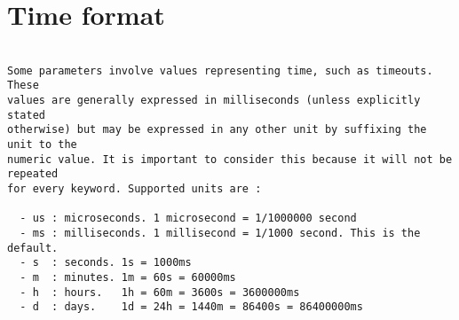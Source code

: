 
\section{Time format}

\begin{verbatim}

Some parameters involve values representing time, such as timeouts. These
values are generally expressed in milliseconds (unless explicitly stated
otherwise) but may be expressed in any other unit by suffixing the unit to the
numeric value. It is important to consider this because it will not be repeated
for every keyword. Supported units are :

  - us : microseconds. 1 microsecond = 1/1000000 second
  - ms : milliseconds. 1 millisecond = 1/1000 second. This is the default.
  - s  : seconds. 1s = 1000ms
  - m  : minutes. 1m = 60s = 60000ms
  - h  : hours.   1h = 60m = 3600s = 3600000ms
  - d  : days.    1d = 24h = 1440m = 86400s = 86400000ms


\end{verbatim}
